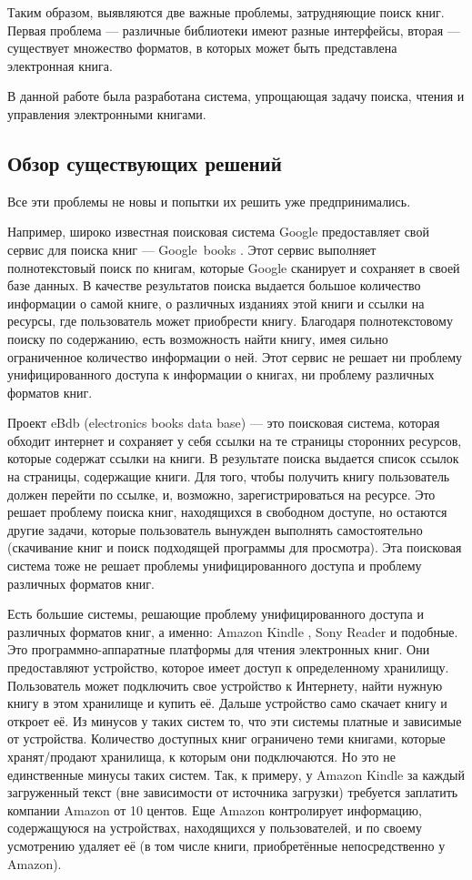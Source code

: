 Таким образом, выявляются две важные проблемы, затрудняющие поиск книг. Первая проблема --- различные библиотеки имеют разные интерфейсы, вторая --- существует множество форматов, в которых может быть представлена электронная книга. 

В данной работе была разработана система, упрощающая задачу поиска, чтения и управления электронными книгами. 


\subsection{Обзор существующих решений}

Все эти проблемы не новы и попытки их решить уже предпринимались.

Например, широко известная поисковая система Google предоставляет свой сервис для поиска книг --- Google~books \cite{googleBook}. Этот сервис выполняет полнотекстовый поиск по книгам, которые Google сканирует и сохраняет в своей базе данных. В качестве результатов поиска выдается большое количество информации о самой книге, о различных изданиях этой книги и ссылки на ресурсы, где пользователь может приобрести книгу. Благодаря полнотекстовому поиску  по содержанию, есть возможность найти книгу, имея сильно ограниченное количество информации о ней. Этот сервис не решает ни проблему унифицированного доступа к информации о книгах, ни проблему различных форматов книг.

Проект eBdb (electronics books data base) \cite{ebdb} --- это поисковая система, которая обходит интернет и сохраняет у себя ссылки на те страницы сторонних ресурсов, которые содержат ссылки на книги. В результате поиска выдается список ссылок на страницы, содержащие книги. Для того, чтобы получить книгу пользователь должен перейти по ссылке, и, возможно, зарегистрироваться на ресурсе. Это решает проблему поиска книг, находящихся в свободном доступе, но остаются другие задачи, которые пользователь вынужден выполнять самостоятельно (скачивание книг и поиск подходящей программы для просмотра). Эта поисковая система тоже не решает проблемы унифицированного доступа и проблему различных форматов книг.

Есть большие системы, решающие проблему унифицированного доступа и различных форматов книг, а именно: Amazon Kindle \cite{kindle}, Sony Reader \cite{sonyreader} и подобные. 
Это программно-аппаратные платформы для чтения электронных книг. Они предоставляют устройство, которое имеет доступ к определенному хранилищу. Пользователь может подключить свое устройство к Интернету, найти нужную книгу в этом хранилище и купить её. Дальше устройство само скачает книгу и откроет её.
Из минусов у таких систем то, что эти системы платные и зависимые от устройства. Количество доступных книг ограничено теми книгами, которые хранят/продают хранилища, к которым они подключаются. Но это не единственные минусы таких систем. Так, к примеру, у Amazon Kindle за каждый загруженный текст (вне зависимости от источника загрузки) требуется заплатить компании Amazon от 10 центов. Еще Amazon контролирует информацию, содержащуюся на устройствах, находящихся у пользователей, и по своему усмотрению удаляет её (в том числе книги, приобретённые непосредственно у Amazon).

